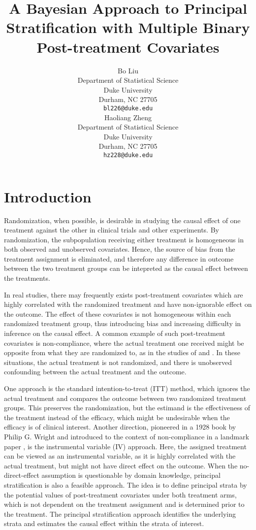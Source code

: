 \documentclass{article}
\title{A Bayesian Approach to Principal Stratification with Multiple Binary Post-treatment Covariates}
\author{%
  Bo Liu \\
  Department of Statistical Science\\
  Duke University\\
  Durham, NC 27705 \\
  \texttt{bl226@duke.edu} \\
  \And
  Haoliang Zheng \\
  Department of Statistical Science\\
  Duke University\\
  Durham, NC 27705 \\
  \texttt{hz228@duke.edu} \\
}
\begin{document}
\maketitle

\section{Introduction}

Randomization, when possible, is desirable in studying the causal effect of one treatment against the other in clinical trials and other experiments. By randomization, the subpopulation receiving either treatment is homogeneous in both observed and unobserved covariates. Hence, the source of bias from the treatment assignment is eliminated, and therefore any difference in outcome between the two treatment groups can be intepreted as the causal effect between the treatments. 

In real studies, there may frequently exists post-treatment covariates which are highly correlated with the randomized treatment and have non-ignorable effect on the outcome. The effect of these covariates is not homogeneous within each randomized treatment group, thus introducing bias and increasing difficulty in inference on the causal effect. A common example of such post-treatment covariates is non-compliance, where the actual treatment one received might be opposite from what they are randomized to, as in the studies of \cite{11546} and \cite{10.1214/13-AOAS674}. In these situations, the actual treatment is not randomized, and there is unobserved confounding between the actual treatment and the outcome.

One approach is the standard intention-to-treat (ITT) method, which ignores the actual treatment and compares the outcome between two randomized treatment groups. This preserves the randomization, but the estimand is the effectiveness of the treatment instead of the efficacy, which might be undesirable when the efficacy is of clinical interest. Another direction, pioneered in a 1928 book by Philip G. Wright and introduced to the context of non-compliance in a landmark paper \cite{doi:10.1080/01621459.1995.10476535}, is the instrumental variable (IV) approach. Here, the assigned treatment can be viewed as an instrumental variable, as it is highly correlated with the actual treatment, but might not have direct effect on the outcome. When the no-direct-effect assumption is questionable by domain knowledge, principal stratification \cite{10.2307/2291629} is also a feasible approach. The idea is to define principal strata by the potential values of post-treatment covariates under both treatment arms, which is not dependent on the treatment assignment and is determined prior to the treatment. The principal stratification approach identifies the underlying strata and estimates the causal effect within the strata of interest.
\end{document}
